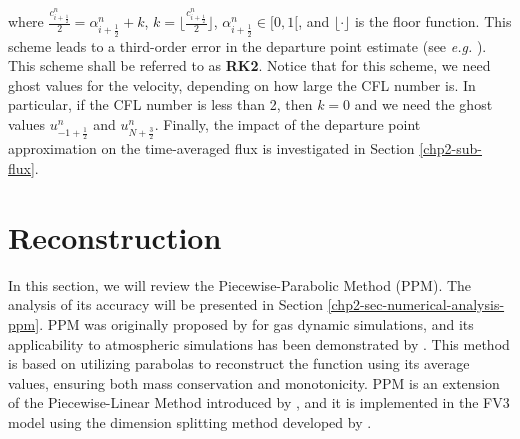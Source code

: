 where $\frac{c_{i+\frac{1}{2}}^n}{2} = \alpha_{i+\frac{1}{2}}^n + k$, 
$k=\lfloor \frac{c_{i+\frac{1}{2}}^n}{2} \rfloor$, $\alpha_{i+\frac{1}{2}}^n \in [0,1[$, and $\lfloor \cdot \rfloor$ is
the floor function. This scheme leads to a third-order error in the departure point estimate (see \textit{e.g.} 
\citet[Section 7.1.2]{durran:2010}). This scheme shall be referred to as \textbf{RK2}. 
Notice that for this scheme, we need ghost values for the velocity, depending on how large the CFL number is.
In particular, if the CFL number is less than 2, then $k=0$ and we need the ghost values $u_{-1+\frac{1}{2}}^n$ and $u_{N+\frac{3}{2}}^n$.
Finally, the impact of the departure point approximation on the time-averaged flux is investigated in 
Section \ref{chp2-sub-flux}.

\section{Reconstruction}
\label{chp2-sec-recon}
In this section, we will review the Piecewise-Parabolic Method (PPM). 
The analysis of its accuracy will be presented in Section \ref{chp2-sec-numerical-analysis-ppm}.
PPM was originally proposed by \citet{colella:1984} for gas dynamic simulations, and its applicability
to atmospheric simulations has been demonstrated by \citet{carpenter:1990}. 
This method is based on utilizing parabolas to reconstruct the function using its average values,
ensuring both mass conservation and monotonicity. PPM is an extension of the Piecewise-Linear Method 
introduced by \citet{vanleer:1977}, and it is implemented in the FV3 model using the dimension
splitting method developed by \citet{lin:1996}.

